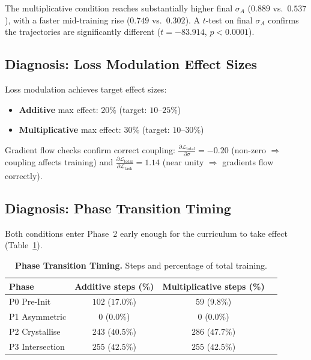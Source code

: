 \documentclass[11pt,a4paper]{article}
\begin{document}
The multiplicative condition reaches substantially higher final
$\sigma_A$ ($0.889$ vs.\ $0.537$), with a faster mid-training rise
($0.749$ vs.\ $0.302$). A $t$-test on final $\sigma_A$ confirms the
trajectories are significantly different ($t = -83.914$, $p < 0.0001$).

\subsection{Diagnosis: Loss Modulation Effect Sizes}

Loss modulation achieves target effect sizes:
\begin{itemize}[nosep]
\item \textbf{Additive} max effect: $20\%$ (target: $10$--$25\%$)
\item \textbf{Multiplicative} max effect: $30\%$ (target: $10$--$30\%$)
\end{itemize}
Gradient flow checks confirm correct coupling:
$\frac{\partial \mathcal{L}_{\text{total}}}{\partial \sigma} = -0.20$
(non-zero $\Rightarrow$ coupling affects training) and
$\frac{\partial \mathcal{L}_{\text{total}}}{\partial \mathcal{L}_{\text{task}}} = 1.14$
(near unity $\Rightarrow$ gradients flow correctly).

\subsection{Diagnosis: Phase Transition Timing}

Both conditions enter Phase~2 early enough for the curriculum to
take effect (Table~\ref{tab:phase-timing}).

\begin{table}[htbp]
\centering
\caption{\textbf{Phase Transition Timing.} Steps and percentage of
total training.\protect\footnotemark}
\label{tab:phase-timing}
\begin{tabular}{l c c c}
\toprule
\textbf{Phase} & \textbf{Additive steps (\%)} & \textbf{Multiplicative steps (\%)} \\
\midrule
P0 Pre-Init & $102$ ($17.0\%$) & $59$ ($9.8\%$) \\
P1 Asymmetric & $0$ ($0.0\%$) & $0$ ($0.0\%$) \\
P2 Crystallise & $243$ ($40.5\%$) & $286$ ($47.7\%$) \\
P3 Intersection & $255$ ($42.5\%$) & $255$ ($42.5\%$) \\
\bottomrule
\end{tabular}
\end{table}
\end{document}
